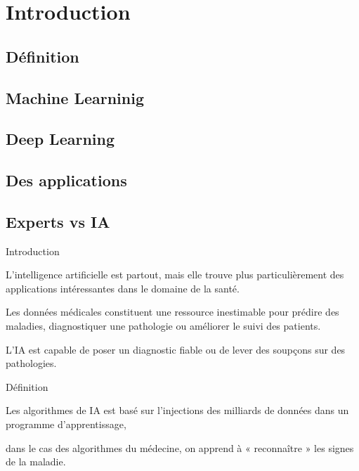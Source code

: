 \section{Introduction}
\subsection{Définition}
\subsection{Machine Learninig}
\subsection{Deep Learning}
\subsection{Des applications}
\subsection{Experts  vs IA}

\begin{frame}{Introduction}
    \begin{enumerate}[<+-|alert@+>]
        \myitem
        L'intelligence artificielle est partout, mais elle trouve plus particulièrement
        des applications intéressantes dans le domaine de la santé.

        \myitem
        Les données médicales constituent une ressource inestimable pour prédire des maladies,
        diagnostiquer une pathologie ou améliorer le suivi des patients.

        \myitem
        L'IA est capable de poser un diagnostic fiable ou de lever des soupçons sur des
        pathologies.\mybox
    \end{enumerate}
\end{frame}




\begin{frame}{Définition}
    \begin{itemize}[<+-|alert@+>]
        \myitem
        Les algorithmes de IA est basé sur  l'injections des milliards de données
        dans un programme d'apprentissage,

        \myitem
        dans le cas des algorithmes du médecine, on apprend à « reconnaître » les signes
        de la maladie.\mybox
    \end{itemize}

\end{frame}

